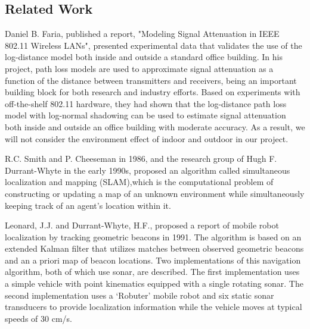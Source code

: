 \subsection{Related Work}
Daniel B. Faria, published a report, "Modeling Signal Attenuation in IEEE 802.11 Wireless LANs", presented experimental data that validates the use of the log-distance model both inside and outside a standard office building. In his project, path loss models are used to approximate signal attenuation as a function of the distance between transmitters and receivers, being an important building block for both research and industry efforts. Based on experiments with off-the-shelf 802.11 hardware, they had shown that the log-distance path loss model with log-normal shadowing can be used to estimate signal attenuation both inside and outside an office building with moderate accuracy. As a result, we will not consider the environment effect of indoor and outdoor in our project. \cite{faria2005modeling}
\par
R.C. Smith and P. Cheeseman in 1986, and the research group of Hugh F. Durrant-Whyte in the early 1990s, proposed an algorithm called simultaneous localization and mapping (SLAM),which is the computational problem of constructing or updating a map of an unknown environment while simultaneously keeping track of an agent's location within it. \cite{wiki:SLAM}
\par
Leonard, J.J. and Durrant-Whyte, H.F., proposed a report of mobile robot localization by tracking geometric beacons in 1991. The algorithm is based on an extended Kalman filter that utilizes matches between observed geometric beacons and an a priori map of beacon locations. Two implementations of this navigation algorithm, both of which use sonar, are described. The first implementation uses a simple vehicle with point kinematics equipped with a single rotating sonar. The second implementation uses a `Robuter' mobile robot and six static sonar transducers to provide localization information while the vehicle moves at typical speeds of 30 cm/s. \cite{88147}

